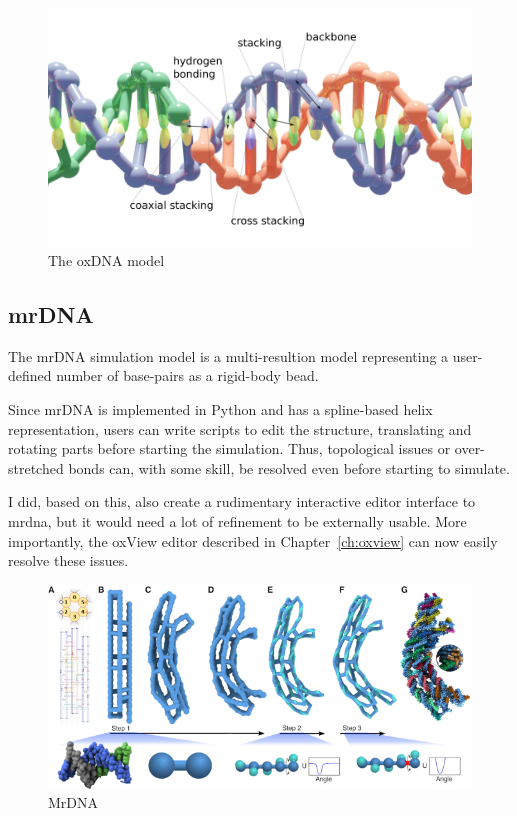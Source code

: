 \begin{figure}[h]
\begin{center}
    \includegraphics[width=\textwidth]{figures/oxdna_annot.png}
    \caption{The oxDNA model}
    \label{fig_oxDNA}
    \end{center}
\end{figure}

\subsection{mrDNA}
The mrDNA simulation model is a multi-resultion model representing a user-defined number of base-pairs as a rigid-body bead.

Since mrDNA is implemented in Python and has a spline-based helix representation, users can write scripts to edit the structure, translating and rotating parts before starting the simulation. Thus, topological issues or over-stretched bonds can, with some skill, be resolved even before starting to simulate.

I did, based on this, also create a rudimentary interactive editor interface to mrdna, but it would need a lot of refinement to be externally usable. More importantly, the oxView editor described in Chapter~\ref{ch:oxview} can now easily resolve these issues.

\begin{figure}[h]
  \begin{center}
    \includegraphics[width=\textwidth]{figures/mrDNA.jpg}
    \caption{MrDNA}
    \label{fig:mrdna}
  \end{center}
\end{figure}

